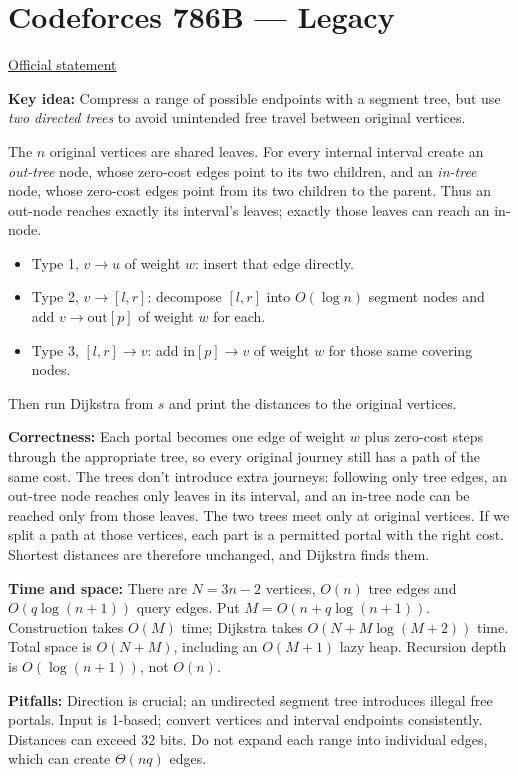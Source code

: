\documentclass[11pt]{article}
\newcommand{\insight}[1]{\par\medskip\noindent\textbf{Key idea:} #1}
\newcommand{\correct}[1]{\par\textbf{Correctness:} #1}
\newcommand{\bounds}[1]{\par\textbf{Time and space:} #1}
\newcommand{\pitfalls}[1]{\par\textbf{Pitfalls:} #1}
\begin{document}
\section{Codeforces 786B --- Legacy}
\href{https://codeforces.com/problemset/problem/786/B}{Official statement}
\insight{Compress a range of possible endpoints with a segment tree, but use \emph{two directed trees} to avoid unintended free travel between original vertices.}

The $n$ original vertices are shared leaves. For every internal interval create an \emph{out-tree} node, whose zero-cost edges point to its two children, and an \emph{in-tree} node, whose zero-cost edges point from its two children to the parent. Thus an out-node reaches exactly its interval's leaves; exactly those leaves can reach an in-node.
\begin{itemize}[nosep]
\item Type 1, $v\to u$ of weight $w$: insert that edge directly.
\item Type 2, $v\to[l,r]$: decompose $[l,r]$ into $O(\log n)$ segment nodes and add $v\to\mathrm{out}[p]$ of weight $w$ for each.
\item Type 3, $[l,r]\to v$: add $\mathrm{in}[p]\to v$ of weight $w$ for those same covering nodes.
\end{itemize}
Then run Dijkstra from $s$ and print the distances to the original vertices.
\correct{Each portal becomes one edge of weight $w$ plus zero-cost steps through the appropriate tree, so every original journey still has a path of the same cost. The trees don't introduce extra journeys: following only tree edges, an out-tree node reaches only leaves in its interval, and an in-tree node can be reached only from those leaves. The two trees meet only at original vertices. If we split a path at those vertices, each part is a permitted portal with the right cost. Shortest distances are therefore unchanged, and Dijkstra finds them.}
\bounds{There are $N=3n-2$ vertices, $O(n)$ tree edges and $O(q\log(n+1))$ query edges. Put $M=O(n+q\log(n+1))$. Construction takes $O(M)$ time; Dijkstra takes $O(N+M\log(M+2))$ time. Total space is $O(N+M)$, including an $O(M+1)$ lazy heap. Recursion depth is $O(\log(n+1))$, not $O(n)$.}
\pitfalls{Direction is crucial; an undirected segment tree introduces illegal free portals. Input is 1-based; convert vertices and interval endpoints consistently. Distances can exceed 32 bits. Do not expand each range into individual edges, which can create $\Theta(nq)$ edges.}
\end{document}
